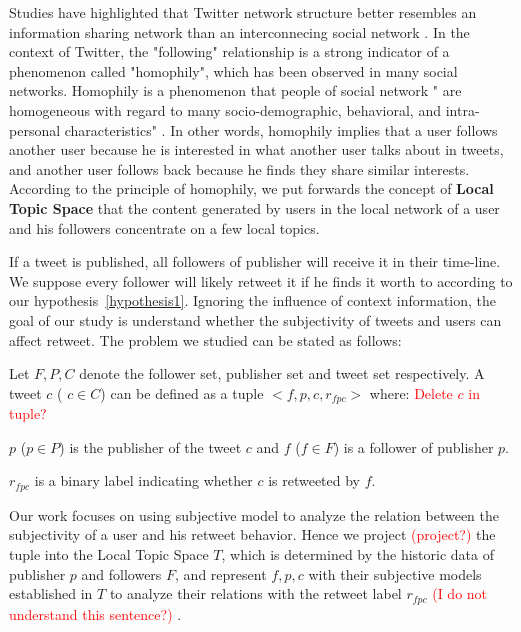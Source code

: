 \documentclass{acm_proc_article-sp}
\newcommand{\mo}[1]{\textcolor{red}{#1}}
\begin{document}
Studies have highlighted that Twitter network structure better resembles an information sharing network than an interconnecing social network \cite{Boyd2010,Kwak:2010TSN}. 
In the context of Twitter, the "following" relationship is a strong indicator of a phenomenon called "homophily", which has been observed in many social networks.
Homophily is a phenomenon that people of social network " are homogeneous with regard to many socio-demographic, behavioral, and intra-personal characteristics" \cite{mcpherson2001birds}.
In other words, homophily implies that a user follows another user because he is interested in what another user talks about in tweets, and another user follows back because he finds they share similar interests. 
According to the principle of homophily, we put forwards the concept of \textbf{Local Topic Space} that the content generated by users in the local network of a user and his followers concentrate on a few local topics.

If a tweet is published, all followers of publisher will receive it in their time-line. We suppose every follower will likely retweet it if he finds it worth to according to our hypothesis~\ref{hypothesis1}.
Ignoring the influence of context information, the goal of our study is understand whether the subjectivity of tweets and users can affect retweet.
The problem we studied can be stated as follows:

Let $ F, P, C $ denote the follower set, publisher set and tweet set respectively. 
A tweet $c$ ( $ c \in C $) can be defined as a tuple $ <f, p, c, r_{fpc}>  $ where: \mo{Delete $c$ in tuple?} 
\begin{itemize*}
\item  $p$ ($p \in P $) is the publisher of the tweet $c$ and $f$ ($ f \in F $) is a follower of publisher $p$.
\item $ r_{fpc} $ is a binary label indicating whether $ c $ is retweeted by $ f $.
\end{itemize*}

Our work focuses on using subjective model to analyze the relation between the subjectivity of a user and his retweet behavior. 
Hence we project \mo{(project?)} the tuple into the Local Topic Space $ T $, which is determined by the historic data of publisher $ p $ and followers $F $, and represent $ f, p, c $ with their subjective models established in $ T $ to analyze their relations with the retweet label $ r_{fpc} $ \mo{(I do not understand this sentence?)} .
\end{document}

